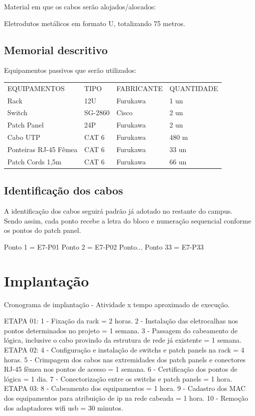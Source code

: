 \documentclass[	DIV=calc,
							paper=a4,
							fontsize=12pt,
							onecolumn]{scrartcl}
\begin{document}
Material em que os cabos serão alojados/alocados:

Eletrodutos metálicos em formato U, totalizando 75 metros.


\subsection{Memorial descritivo}

Equipamentos passivos que serão utilizados:

\begin{table}[]
	\begin{tabular}{llll}
		EQUIPAMENTOS       		 & TIPO    & FABRICANTE & QUANTIDADE \\
		Rack              	 	 & 12U     & Furukawa   & 1 un       \\
		Switch           	  	 & SG-2860 & Cisco      & 2 un       \\
		Patch Panel       		 & 24P     & Furukawa   & 2 un       \\
		Cabo UTP           		 & CAT 6   & Furukawa   & 480 m      \\
		Ponteiras RJ-45 Fêmea    & CAT 6   & Furukawa   & 33 un      \\
		Patch Cords 1,5m  		 & CAT 6   & Furukawa   & 66 un     
	\end{tabular}
\end{table}

\subsection{Identificação dos cabos}

A identificação dos cabos seguirá padrão já adotado no restante do campus. Sendo assim, cada ponto recebe a letra do bloco e numeração sequencial conforme os pontos do patch panel.

Ponto 1 = E7-P01
Ponto 2 = E7-P02
Ponto...
Ponto 33 = E7-P33

\section{Implantação}
Cronograma de implantação - Atividade x tempo aproximado de execução.

ETAPA 01:
1 - Fixação da rack = 2 horas.
2 - Instalação das eletrocalhas nos pontos determinados no projeto = 1 semana.
3 - Passagem do cabeamento de lógica, inclusive o cabo provindo da estrutura de rede já existente = 1 semana.
ETAPA 02:
4 - Configuração e instalação de switchs e patch panels na rack = 4 horas.
5 - Crimpagem dos cabos nas extremidades dos patch panels e conectores RJ-45 fêmea nos pontos de acesso = 1 semana.
6 - Certificação dos pontos de lógica = 1 dia.
7 - Conectorização entre os switchs e patch panels = 1 hora.
ETAPA 03:
8 - Cabeamento dos equipamentos = 1 hora.
9 - Cadastro dos MAC dos equipamentos para atribuição de ip na rede cabeada = 1 hora.
10 - Remoção dos adaptadores wifi usb = 30 minutos.
\end{document}
